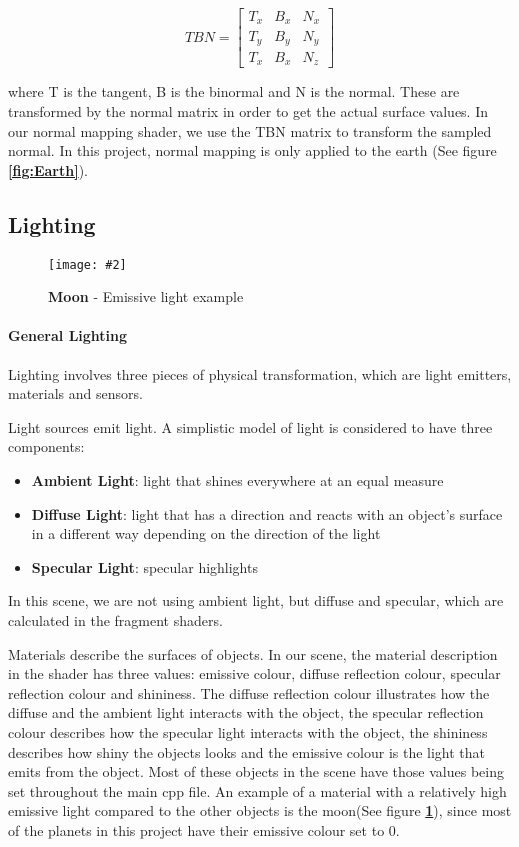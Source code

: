 \documentclass[10pt, a4paper]{article}
\newcommand{\figuremacro}[5]{
    \begin{figure}[#1]
        \centering
        \texttt{[image: \#2]}
        \caption[#3]{\textbf{#3}#4}
        \label{fig:#2}
    \end{figure}
}
\begin{document}
	    \[
	    TBN=
	    \begin{bmatrix}
	    T_x & B_x & N_x  \\
	    T_y & B_y & N_y  \\
	    T_x & B_x & N_z
	    \end{bmatrix}
	    \]
	    
	where T is the tangent, B is the binormal and N is the normal. These are transformed by the normal matrix in order to get the actual surface values. In our normal mapping shader, we use the TBN matrix to transform the sampled normal. In this project, normal mapping is only applied to the earth (See figure \textbf{\ref{fig:Earth}}).
	
\subsection{Lighting}

	\figuremacro{H}{Moon}{Moon}{ - Emissive light example}{1.0}

	\paragraph{General Lighting} Lighting involves three pieces of physical transformation, which are light emitters, materials and sensors. 
	
	Light sources emit light. A simplistic model of light is considered to have three components:
		\begin{itemize}
			\item \textbf{Ambient Light}: light that shines everywhere at an equal measure
			\item \textbf{Diffuse Light}: light that has a direction and reacts with an object's surface in a different  way depending on the direction of the light
			\item \textbf{Specular Light}: specular highlights
		\end{itemize}
	In this scene, we are not using ambient light, but diffuse and specular, which are calculated in the fragment shaders.
	
	
	Materials describe the surfaces of objects. In our scene, the material description in the shader has three values: emissive colour, diffuse reflection colour, specular reflection colour and shininess. The diffuse reflection colour illustrates how the diffuse and the ambient light interacts with the object, the specular reflection colour describes how the specular light interacts with the object, the shininess describes how shiny the objects looks and the emissive colour is the light that emits from the object. Most of these objects in the scene have those values being set throughout the main cpp file. An example of a material with a relatively high emissive light compared to the other objects is the moon(See figure \textbf{\ref{fig:Moon}}), since most of the planets in this project have their emissive colour set to 0.
	
\end{document}
